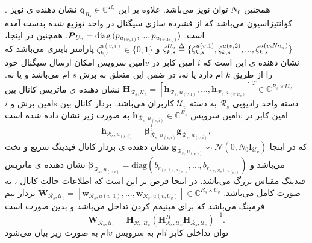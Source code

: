.
همچنین
$N_0$
توان نویز می‌باشد.
علاوه بر این
$\boldsymbol{q}_{R_s} \in \mathbb{C}^{{R}_s }  $
نشان دهنده ی نویز کوانتیزاسیون می‌باشد که از فشرده سازی سیگنال  در واحد توزیع شده بدست آمده است.
$\boldsymbol{P}_{U_v} = \mathop{\mathrm{diag}}{(p_{u_{(v,1)}}, ..., p_{u_{(v,\mathcal{U}_v)}})}$.
همچنین در اینجا، 
$\zeta_{k,s}^{U_v} \delequal \{\zeta_{k,s}^{u(v,1)},\zeta_{k,s}^{u(v,2)},...,\zeta_{k,s}^{u(v,N_{U_v})}\}$
و 
$\zeta_{k,s}^{u(v,i)} \in \{0,1\}$
پارامتر باینری می‌باشد که نشان دهنده ی این است که $i$ امین کابر در $v$امین سرویس امکان ارسال سیگنال خود را از طریق 
$k$
ام دارد یا نه، در ضمن این  
 متعلق به برش $s$ ام می‌باشد و یا نه.
 $\boldsymbol{H}_{\mathcal{R}_s,\mathcal{U}_v}=\left[\boldsymbol{h}_{\mathcal{R}_s,u_{(v,1)}},\ldots,\boldsymbol{h}_{\mathcal{R}_s,v_{(v,\mathcal{U}_v)}}\right]^T  \in \mathbb{C}^{{R}_s\times {U}_v }$
نشان دهنده ی ماتریس کانال بین دسته واحد رادیویی 
 $\mathcal{R}_s$
 به دسته 
 $\mathcal{U}_v$
 کاربران می‌باشد.
بردار کانال بین $s$امین برش و $i$امین کابر در $v$امین سرویس $\boldsymbol{h}_{\mathcal{R}_s,u_{(v,i)}}\in \mathbb{C}^{{R}_s}$ به صورت زیر نشان داده شده است 
\begin{equation}
\boldsymbol{h}_{\mathcal{R}_s,u_{(s,i)}} = \boldsymbol{\beta}^\frac{1}{2}_{\mathcal{R}_s,u_{(v,i)}} \boldsymbol{g}_{\mathcal{R}_s,u_{(v,i)}},
\end{equation} 
که در اینجا 
$\boldsymbol{g}_{\mathcal{R}_s,u_{(v,i)}} \backsim \mathcal{N}(0,N_0\boldsymbol{I}_{\mathcal{U}_v})$
نشان دهنده ی بردار کانال فیدینگ سریع و تخت می‌باشد و
 $\boldsymbol{\beta}_{\mathcal{R}_s,u_{(v,i)}}=\text{diag}(b_{r_{(s,1),u_{(v,i)}}},\ldots,b_{r_{(s,\mathcal{R}_s),u_{(v,i)}}})$
 نشان دهنده ی ماتریس فیدینگ مقیاس بزرگ می‌باشد.
در اینجا فرض بر این است که اطلاعات حالت کانال ، به صورت کامل می‌باشد.\newline
 $\boldsymbol{W}_{\mathcal{R}_s,\mathcal{U}_v} = [\boldsymbol{w}_{\mathcal{R}_s,u(v,1)},...,\boldsymbol{w}_{\mathcal{R}_s,u(v,U_v)}] \in \mathbb{C}^{{R}_s\times U_v} $
 بردار بیم فرمینگ 
  می‌باشد که برای مینیمم کردن تداخل می‌باشد و بدین صورت است
\begin{equation}
\textstyle \boldsymbol{W}_{\mathcal{R}_s,\mathcal{U}_v} = \boldsymbol{H}_{\mathcal{R}_s,\mathcal{U}_v}(\boldsymbol{H}_{\mathcal{R}_s,\mathcal{U}_v}^H \boldsymbol{H}_{\mathcal{R}_s,\mathcal{U}_v})^{-1}.
\end{equation}  
توان تداخلی کابر $i$ام به سرویس $v$ام به صورت زیر بیان می‌شود
